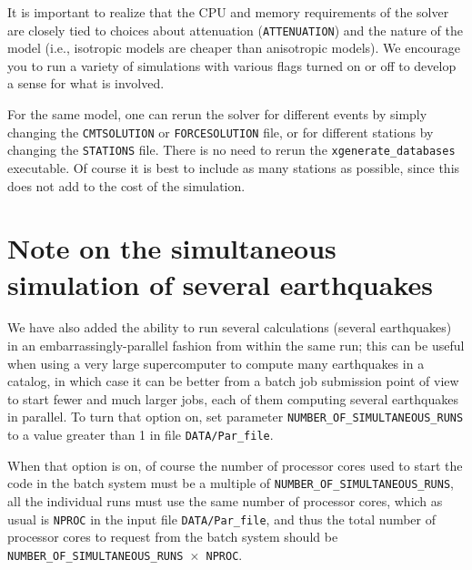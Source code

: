 It is important to realize that the CPU and memory requirements of
the solver are closely tied to choices about attenuation (\texttt{ATTENUATION})
and the nature of the model (i.e., isotropic models are cheaper than
anisotropic models). We encourage you to run a variety of simulations
with various flags turned on or off to develop a sense for what is
involved.

For the same model, one can rerun the solver for different events
by simply changing the \texttt{CMTSOLUTION} or \texttt{FORCESOLUTION}
file, or for different stations by changing the \texttt{STATIONS}
file. There is no need to rerun the \texttt{xgenerate\_databases}
executable. Of course it is best to include as many stations as possible,
since this does not add to the cost of the simulation.


\section{Note on the simultaneous simulation of several earthquakes}

We have also added the ability to run several calculations (several earthquakes)
in an embarrassingly-parallel fashion from within the same run;
this can be useful when using a very large supercomputer to compute
many earthquakes in a catalog, in which case it can be better from
a batch job submission point of view to start fewer and much larger jobs,
each of them computing several earthquakes in parallel.
To turn that option on, set parameter \texttt{NUMBER\_OF\_SIMULTANEOUS\_RUNS}
to a value greater than 1 in file \texttt{DATA/Par\_file}.


When that option is on, of course the number of processor cores used to start
the code in the batch system must be a multiple of \texttt{NUMBER\_OF\_SIMULTANEOUS\_RUNS},
all the individual runs must use the same number of processor cores,
which as usual is \texttt{NPROC} in the input file \texttt{DATA/Par\_file},
and thus the total number of processor cores to request from the batch system
should be \texttt{NUMBER\_OF\_SIMULTANEOUS\_RUNS $\times$ NPROC}.


